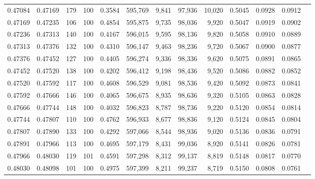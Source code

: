 \begin{tabular}{rrrrrrrrrrrrr}
0.47084 & 0.47169 &   179 & 100 &                                     0.3584 & 595,769 &   9,841 &  97,936 &  10,020 & 0.5045 & 0.0928 & 0.0912 \\
0.47169 & 0.47235 &   106 & 100 &                                     0.4854 & 595,875 &   9,735 &  98,036 &   9,920 & 0.5047 & 0.0919 & 0.0902 \\
0.47236 & 0.47313 &   140 & 100 &                                     0.4167 & 596,015 &   9,595 &  98,136 &   9,820 & 0.5058 & 0.0910 & 0.0889 \\
0.47313 & 0.47376 &   132 & 100 &                                     0.4310 & 596,147 &   9,463 &  98,236 &   9,720 & 0.5067 & 0.0900 & 0.0877 \\
0.47376 & 0.47452 &   127 & 100 &                                     0.4405 & 596,274 &   9,336 &  98,336 &   9,620 & 0.5075 & 0.0891 & 0.0865 \\
0.47452 & 0.47520 &   138 & 100 &                                     0.4202 & 596,412 &   9,198 &  98,436 &   9,520 & 0.5086 & 0.0882 & 0.0852 \\
0.47520 & 0.47592 &   117 & 100 &                                     0.4608 & 596,529 &   9,081 &  98,536 &   9,420 & 0.5092 & 0.0873 & 0.0841 \\
0.47592 & 0.47666 &   146 & 100 &                                     0.4065 & 596,675 &   8,935 &  98,636 &   9,320 & 0.5105 & 0.0863 & 0.0828 \\
0.47666 & 0.47744 &   148 & 100 &                                     0.4032 & 596,823 &   8,787 &  98,736 &   9,220 & 0.5120 & 0.0854 & 0.0814 \\
0.47744 & 0.47807 &   110 & 100 &                                     0.4762 & 596,933 &   8,677 &  98,836 &   9,120 & 0.5124 & 0.0845 & 0.0804 \\
0.47807 & 0.47890 &   133 & 100 &                                     0.4292 & 597,066 &   8,544 &  98,936 &   9,020 & 0.5136 & 0.0836 & 0.0791 \\
0.47891 & 0.47966 &   113 & 100 &                                     0.4695 & 597,179 &   8,431 &  99,036 &   8,920 & 0.5141 & 0.0826 & 0.0781 \\
0.47966 & 0.48030 &   119 & 101 &                                     0.4591 & 597,298 &   8,312 &  99,137 &   8,819 & 0.5148 & 0.0817 & 0.0770 \\
0.48030 & 0.48098 &   101 & 100 &                                     0.4975 & 597,399 &   8,211 &  99,237 &   8,719 & 0.5150 & 0.0808 & 0.0761 \\

\end{tabular}
